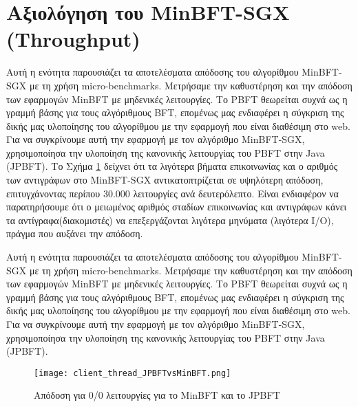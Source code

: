 \section{Αξιολόγηση του MinBFT-SGX (Throughput)}
Αυτή η ενότητα παρουσιάζει τα αποτελέσματα απόδοσης του αλγορίθμου MinBFT-SGX με τη χρήση micro-benchmarks. Μετρήσαμε την καθυστέρηση και την απόδοση των εφαρμογών MinBFT με μηδενικές λειτουργίες. Το PBFT θεωρείται συχνά ως η γραμμή βάσης για τους αλγόριθμους BFT, επομένως μας ενδιαφέρει η σύγκριση της δικής μας υλοποίησης του αλγορίθμου με την εφαρμογή που είναι διαθέσιμη στο web. Για να συγκρίνουμε αυτή την εφαρμογή με τον αλγόριθμο MinBFT-SGX, χρησιμοποίησα την υλοποίηση της κανονικής λειτουργίας του PBFT στην Java (JPBFT).
Το Σχήμα \ref{fig:JPBFTvsMinBFT} δείχνει ότι τα λιγότερα βήματα επικοινωνίας και ο αριθμός των αντιγράφων στο MinBFT-SGX αντικατοπτρίζεται σε υψηλότερη απόδοση, επιτυγχάνοντας περίπου 30.000 λειτουργίες ανά δευτερόλεπτο. Είναι ενδιαφέρον να παρατηρήσουμε ότι ο μειωμένος αριθμός σταδίων επικοινωνίας και αντιγράφων κάνει τα αντίγραφα(διακομιστές) να επεξεργάζονται λιγότερα μηνύματα (λιγότερα I/O), πράγμα που αυξάνει την απόδοση.

Αυτή η ενότητα παρουσιάζει τα αποτελέσματα απόδοσης του αλγορίθμου MinBFT-SGX με τη χρήση micro-benchmarks. Μετρήσαμε την καθυστέρηση και την απόδοση των εφαρμογών MinBFT με μηδενικές λειτουργίες. Το PBFT θεωρείται συχνά ως η γραμμή βάσης για τους αλγόριθμους BFT, επομένως μας ενδιαφέρει η σύγκριση της δικής μας υλοποίησης του αλγορίθμου με την εφαρμογή που είναι διαθέσιμη στο web. Για να συγκρίνουμε αυτή την εφαρμογή με τον αλγόριθμο MinBFT-SGX, χρησιμοποίησα την υλοποίηση της κανονικής λειτουργίας του PBFT στην Java (JPBFT).

\begin{figure}
\centering
\texttt{[image: client\_thread\_JPBFTvsMinBFT.png]}
\caption{Aπόδοση για 0/0 λειτουργίες για το MinBFT και το JPBFT}
\label{fig:JPBFTvsMinBFT}
\end{figure}